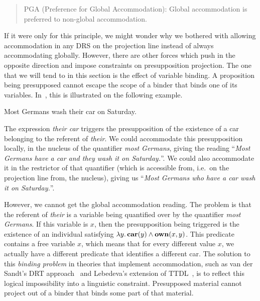 \begin{quote}
PGA (Preference for Global Accommodation): Global accommodation is
preferred to non-global accommodation.
\end{quote}

If it were only for this principle, we might wonder why we bothered with
allowing accommodation in any DRS on the projection line instead of always
accommodating globally. However, there are other forces which push in the
opposite direction and impose constraints on presupposition projection. The
one that we will tend to in this section is the effect of variable
binding. A proposition being presupposed cannot escape the scope of a
binder that binds one of its variables. In~\cite{sep-presupposition}, this
is illustrated on the following example.

\begin{exe}
  \ex \label{ex:most-germans-wash} Most Germans wash their car on Saturday.
\end{exe}

The expression \emph{their car} triggers the presupposition of the
existence of a car belonging to the referent of \emph{their}. We could
accommodate this presupposition locally, in the nucleus of the quantifier
\emph{most Germans}, giving the reading ``\emph{Most Germans have a car and
  they wash it on Saturday.}''. We could also accommodate it in the
restrictor of that quantifier (which is accessible from, i.e.\ on the
projection line from, the nucleus), giving us ``\emph{Most Germans who have
  a car wash it on Saturday.}''.

However, we cannot get the global accommodation reading. The problem is
that the referent of \emph{their} is a variable being quantified over by
the quantifier \emph{most Germans}. If this variable is $x$, then the
presupposition being triggered is the existence of an individual satisfying
$\lambda y.\, \textbf{car}(y) \land \textbf{own}(x, y)$. This predicate contains a
free variable $x$, which means that for every different value $x$, we
actually have a different predicate that identifies a different car. The
solution to this \emph{binding problem} in theories that implement
accommodation, such as van der Sandt's DRT
approach~\cite{van1992presupposition} and Lebedeva's extension of
TTDL~\cite{lebedeva2012expression}, is to reflect this logical
impossibility into a linguistic constraint. Presupposed material cannot
project out of a binder that binds some part of that material.

